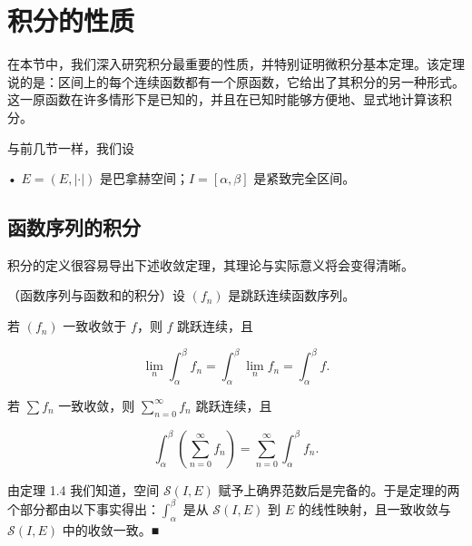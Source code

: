 \section{积分的性质}

在本节中，我们深入研究积分最重要的性质，并特别证明微积分基本定理。该定理说的是：区间上的每个连续函数都有一个原函数，它给出了其积分的另一种形式。这一原函数在许多情形下是已知的，并且在已知时能够方便地、显式地计算该积分。

与前几节一样，我们设

• $ E = (E, \left| \cdot \right|) $ 是巴拿赫空间；$ I = [\alpha, \beta] $ 是紧致完全区间。

\subsection*{函数序列的积分}

积分的定义很容易导出下述收敛定理，其理论与实际意义将会变得清晰。

\begin{proposition}

（函数序列与函数和的积分）设 $ (f_n) $ 是跳跃连续函数序列。

\begin{subitems}
\item

若 $ (f_n) $ 一致收敛于 $ f $，则 $ f $ 跳跃连续，且

\[
\lim_{n} \int_{\alpha}^{\beta} f_n = \int_{\alpha}^{\beta} \lim_{n} f_n = \int_{\alpha}^{\beta} f .
\]
\item

若 $ \sum f_n $ 一致收敛，则 $ \sum_{n=0}^{\infty} f_n $ 跳跃连续，且

\[
\int_{\alpha}^{\beta} \left( \sum_{n=0}^{\infty} f_n \right) = \sum_{n=0}^{\infty} \int_{\alpha}^{\beta} f_n .
\]

\proofhead
由定理 1.4 我们知道，空间 $ \mathcal{S}(I, E) $ 赋予上确界范数后是完备的。于是定理的两个部分都由以下事实得出：$ \int_{\alpha}^{\beta} $ 是从 $ \mathcal{S}(I, E) $ 到 $ E $ 的线性映射，且一致收敛与 $ \mathcal{S}(I, E) $ 中的收敛一致。\nobreak\hspace{0.35em}■
\end{subitems}

\end{proposition}


